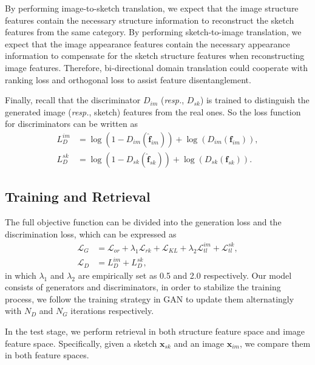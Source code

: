 \documentclass[10pt,twocolumn,letterpaper]{article}
\begin{document}
By performing image-to-sketch translation, we expect that the image structure features contain the necessary structure information to reconstruct the sketch features from the same category. By performing sketch-to-image translation, we expect that the image appearance features contain the necessary appearance information to compensate for the sketch structure features when reconstructing image features. Therefore, bi-directional domain translation could cooperate with ranking loss and orthogonal loss to assist feature disentanglement.

Finally, recall that the discriminator $D_{im}$ (\emph{resp.}, $D_{sk}$) is trained to distinguish the generated image (\emph{resp.}, sketch) features from the real ones. So the loss function for discriminators can be written as
\vspace{-4pt}
\begin{align}
    L_{D}^{im} &= \log(1\!-\!D_{im}(\hat{\mathbf{f}}_{im})) \!+\! \log(D_{im}(\mathbf{f}_{im})), \\
    L_{D}^{sk} &= \log(1\!-\!D_{sk}(\hat{\mathbf{f}}_{sk})) \!+\! \log(D_{sk}(\mathbf{f}_{sk})).
\end{align}

\subsection{Training and Retrieval} \label{3.3}

The full objective function can be divided into the generation loss and the discrimination loss, which can be expressed as
\vspace{-5pt}
\begin{align} \label{eqn:total_loss}
    \mathcal{L}_{G} \!&=\! \mathcal{L}_{or} \!+\! \lambda_1 \mathcal{L}_{rk} \!+\! \mathcal{L}_{KL} \!+\! \lambda_2 \mathcal{L}_{tl}^{im} \!+\! \mathcal{L}_{tl}^{sk}, \\
    \mathcal{L}_{D} &= L_{D}^{im} \!+\!  L_{D}^{sk},
\end{align}
in which $\lambda_1$ and $\lambda_2$ are empirically set as 0.5 and 2.0 respectively. 
Our model consists of generators and discriminators, in order to stabilize the training process, we follow the training strategy in GAN \cite{goodfellow2014generative} to update them alternatingly with $N_{D}$ and $N_{G}$ iterations respectively.

In the test stage, we perform retrieval in both structure feature space and image feature space. Specifically, given a sketch $\mathbf{x}_{sk}$ and an image $\mathbf{x}_{im}$, we compare them in both feature spaces.
\end{document}
